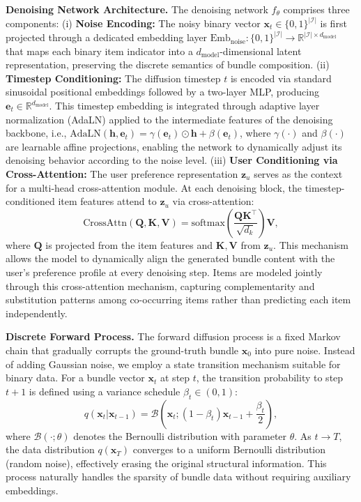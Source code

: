 \documentclass[lettersize,journal]{IEEEtran}
\begin{document}
\noindent\textbf{Denoising Network Architecture.}
The denoising network $f_\theta$ comprises three components: (i) \textbf{Noise Encoding:} The noisy binary vector $\mathbf{x}_t \in \{0,1\}^{|\mathcal{I}|}$ is first projected through a dedicated embedding layer $\text{Emb}_{\text{noise}}: \{0,1\}^{|\mathcal{I}|} \to \mathbb{R}^{|\mathcal{I}| \times d_{\text{model}}}$ that maps each binary item indicator into a $d_{\text{model}}$-dimensional latent representation, preserving the discrete semantics of bundle composition. (ii) \textbf{Timestep Conditioning:} The diffusion timestep $t$ is encoded via standard sinusoidal positional embeddings followed by a two-layer MLP, producing $\mathbf{e}_t \in \mathbb{R}^{d_{\text{model}}}$. This timestep embedding is integrated through adaptive layer normalization (AdaLN) applied to the intermediate features of the denoising backbone, i.e., $\text{AdaLN}(\mathbf{h}, \mathbf{e}_t) = \gamma(\mathbf{e}_t) \odot \mathbf{h} + \beta(\mathbf{e}_t)$, where $\gamma(\cdot)$ and $\beta(\cdot)$ are learnable affine projections, enabling the network to dynamically adjust its denoising behavior according to the noise level. (iii) \textbf{User Conditioning via Cross-Attention:} The user preference representation $\mathbf{z}_u$ serves as the context for a multi-head cross-attention module. At each denoising block, the timestep-conditioned item features attend to $\mathbf{z}_u$ via cross-attention:
\begin{equation}
    \text{CrossAttn}(\mathbf{Q}, \mathbf{K}, \mathbf{V}) = \text{softmax}(\frac{\mathbf{Q}\mathbf{K}^\top}{\sqrt{d_k}})\mathbf{V},
\end{equation}
where $\mathbf{Q}$ is projected from the item features and $\mathbf{K}, \mathbf{V}$ from $\mathbf{z}_u$. This mechanism allows the model to dynamically align the generated bundle content with the user's preference profile at every denoising step. Items are modeled jointly through this cross-attention mechanism, capturing complementarity and substitution patterns among co-occurring items rather than predicting each item independently.

\noindent\textbf{Discrete Forward Process.}
The forward diffusion process is a fixed Markov chain that gradually corrupts the ground-truth bundle $\mathbf{x}_0$ into pure noise. Instead of adding Gaussian noise, we employ a state transition mechanism suitable for binary data. For a bundle vector $\mathbf{x}_t$ at step $t$, the transition probability to step $t+1$ is defined using a variance schedule $\beta_t \in (0, 1)$:
\begin{equation}
    q(\mathbf{x}_t | \mathbf{x}_{t-1}) = \mathcal{B}\left(\mathbf{x}_t; (1 - \beta_t)\mathbf{x}_{t-1} + \frac{\beta_t}{2}\right),
\end{equation}
where $\mathcal{B}(\cdot; \theta)$ denotes the Bernoulli distribution with parameter $\theta$. As $t \to T$, the data distribution $q(\mathbf{x}_T)$ converges to a uniform Bernoulli distribution (random noise), effectively erasing the original structural information. This process naturally handles the sparsity of bundle data without requiring auxiliary embeddings.
\end{document}
